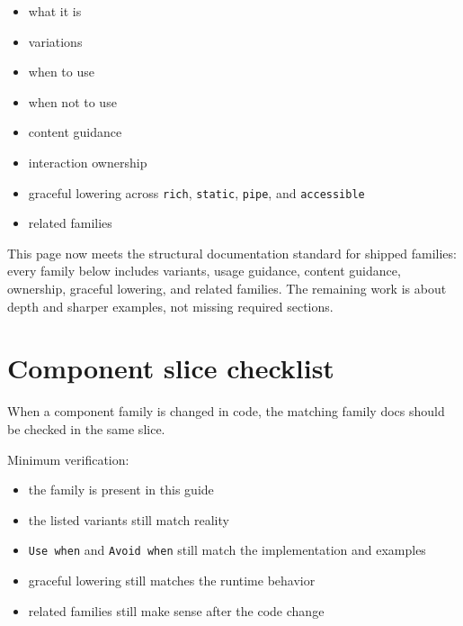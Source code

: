\begin{itemize}
\tightlist
\item
  what it is
\item
  variations
\item
  when to use
\item
  when not to use
\item
  content guidance
\item
  interaction ownership
\item
  graceful lowering across \texttt{r\allowbreak{}i\allowbreak{}c\allowbreak{}h}, \texttt{s\allowbreak{}t\allowbreak{}a\allowbreak{}t\allowbreak{}i\allowbreak{}c}, \texttt{p\allowbreak{}i\allowbreak{}p\allowbreak{}e}, and \texttt{a\allowbreak{}c\allowbreak{}c\allowbreak{}e\allowbreak{}s\allowbreak{}s\allowbreak{}i\allowbreak{}b\allowbreak{}l\allowbreak{}e}
\item
  related families
\end{itemize}

This page now meets the structural documentation standard for shipped families: every family below includes variants, usage guidance, content guidance, ownership, graceful lowering, and related families. The remaining work is about depth and sharper examples, not missing required sections.

\section{Component slice checklist}\label{record-019-component-slice-checklist}

When a component family is changed in code, the matching family docs should be checked in the same slice.

Minimum verification:

\begin{itemize}
\tightlist
\item
  the family is present in this guide
\item
  the listed variants still match reality
\item
  \texttt{U\allowbreak{}s\allowbreak{}e\allowbreak{} \allowbreak{}w\allowbreak{}h\allowbreak{}e\allowbreak{}n} and \texttt{A\allowbreak{}v\allowbreak{}o\allowbreak{}i\allowbreak{}d\allowbreak{} \allowbreak{}w\allowbreak{}h\allowbreak{}e\allowbreak{}n} still match the implementation and examples
\item
  graceful lowering still matches the runtime behavior
\item
  related families still make sense after the code change
\end{itemize}


